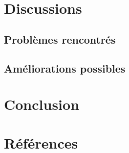 \documentclass[a4paper, 12pt]{article}
\begin{document}
\newpage
\section{Discussions}
\subsection{Problèmes rencontrés}


\subsection{Améliorations possibles}


\newpage
\section{Conclusion}


\newpage
\section*{Références}
\nocite{*}


\end{document}

